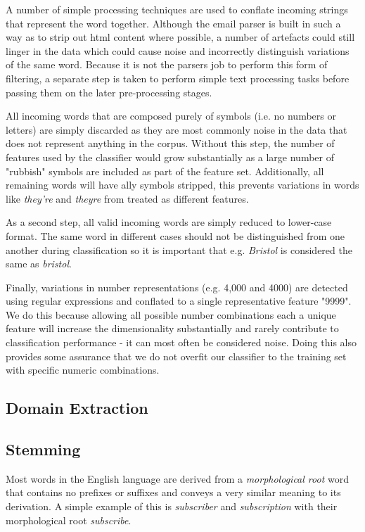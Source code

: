 A number of simple processing techniques are used to conflate incoming strings that represent the word together. Although the email parser is built in such a way as to strip out html content where possible, a number of artefacts could still linger in the data which could cause noise and incorrectly distinguish variations of the same word. Because it is not the parsers job to perform this form of filtering, a separate step is taken to perform simple text processing tasks before passing them on the later pre-processing stages.

All incoming words that are composed purely of symbols (i.e. no numbers or letters) are simply discarded as they are most commonly noise in the data that does not represent anything in the corpus. Without this step, the number of features used by the classifier would grow substantially as a large number of "rubbish" symbols are included as part of the feature set. Additionally, all remaining words will have ally symbols stripped, this prevents variations in words like {\it they're} and {\it theyre} from treated as different features.

As a second step, all valid incoming words are simply reduced to lower-case format. The same word in different cases should not be distinguished from one another during classification so it is important that e.g. {\it Bristol} is considered the same as {\it bristol}.

Finally, variations in number representations (e.g. 4,000 and 4000) are detected using regular expressions and conflated to a single representative feature "9999". We do this because allowing all possible number combinations each a unique feature will increase the dimensionality substantially and rarely contribute to classification performance - it can most often be considered noise. Doing this also provides some assurance that we do not overfit our classifier to the training set with specific numeric combinations.

\subsection{Domain Extraction}



\subsection{Stemming}
Most words in the English language are derived from a {\it morphological root} word that contains no prefixes or suffixes and conveys a very similar meaning to its derivation. A simple example of this is {\it subscriber} and {\it subscription} with their morphological root {\it subscribe}. 

